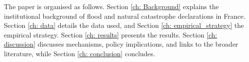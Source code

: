 




\noindent The paper is organised as follows. Section \ref{ch: Background} explains the institutional background of flood and natural catastrophe declarations in France. Section \ref{ch: data} details the data used, and Section \ref{ch: empirical_strategy} the empirical strategy. Section \ref{ch: results} presents the results. Section \ref{ch: discussion} discusses mechanisms, policy implications, and links to the broader literature, while Section \ref{ch: conclusion} concludes.


